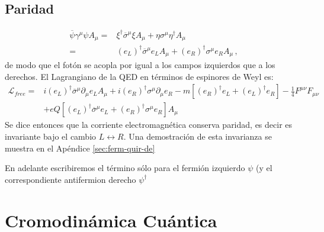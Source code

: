 \subsection{Paridad}
\begin{align}
  \overline{\psi}\gamma^{\mu}\psi A_{\mu}=&
\xi^{\dagger}\overline{\sigma}^{\mu}\xi A_{\mu}+\eta\sigma^{\mu}\eta^{\dagger} A_{\mu}\nonumber\\
=&(e_L)^{\dagger}\overline{\sigma}^{\mu}e_L A_{\mu}+(e_R)^{\dagger}\sigma^{\mu}e_{R} A_{\mu}\,,
\end{align}
de modo que el fotón se acopla por igual a los campos izquierdos que a los derechos. El Lagrangiano de la QED en términos de espinores de Weyl es:
\begin{align}
  \mathcal{L}_{free}=&i(e_L)^{\dagger}\overline{\sigma}^{\mu}\partial_{\mu}e_L A_{\mu}+i(e_R)^{\dagger}\sigma^{\mu}\partial_{\mu}e_{R}
-m \left[ \left( e_R \right)^\dagger e_L+\left( e_L \right)^{\dagger}e_R \right] -\tfrac{1}{4}F^{\mu\nu}F_{\mu\nu}\nonumber\\
   &+eQ \left[(e_L)^{\dagger}\overline{\sigma}^{\mu}e_L+(e_R)^{\dagger}\sigma^{\mu}e_{R}  \right] A_{\mu}
\end{align}
Se dice entonces que la corriente  electromagnética conserva paridad, es decir es invariante bajo el cambio $L\leftrightarrow R$. 
Una demostración de esta invarianza se muestra en el Apéndice \ref{sec:ferm-quir-de}

En adelante escribiremos el término sólo para el fermión izquierdo $\psi$ (y el correspondiente antifermion derecho $\psi^{\dagger}$

\section{Cromodinámica Cuántica}
\label{sec:inter-fuert}

